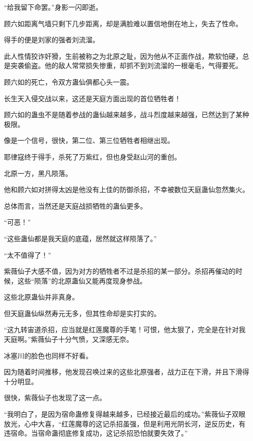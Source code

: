 \begin{this_body}
“给我留下命罢。”身影一闪即逝。

顾六如距离气墙只剩下几步距离，却是满脸难以置信地倒在地上，失去了性命。

得手的便是刘家的强者刘流溜。

此人性情狡诈奸猾，生前被称之为北原之耻，因为他从不正面作战，欺软怕硬，总是突袭偷盗。他的敌人常常损失惨重，却抓不到刘流溜的一根毫毛，气得要死。

顾六如的死亡，令双方蛊仙俱都心头一震。

长生天入侵交战以来，这还是天庭方面出现的首位牺牲者！

顾六如的蛊虫不是随着参战的蛊仙越来越多，战斗烈度越来越强，已然达到了某种极限。

像是一个信号，很快，第二位、第三位牺牲者相继出现。

耶律寇终于得手，杀死了万紫红，但也身受赵山河的重创。

北原一方，黑凡陨落。

他和顾六如对拼得太凶是他没有上佳的防御杀招，不幸被数位天庭蛊仙忽然集火。

总体而言，当然还是天庭战损牺牲的蛊仙更多。

“可恶！”

“这些蛊仙都是我天庭的底蕴，居然就这样陨落了。”

“太不值得了！”

紫薇仙子大感不值，因为对方的牺牲者不过是杀招的某一部分。杀招再催动的时候，这些“陨落”的北原蛊仙又能再度现身参战。

这些北原蛊仙并非真身。

但天庭蛊仙纵然寿元无多，但其性命却是实打实的。

“这九转宙道杀招，应当就是红莲魔尊的手笔！可恨，他太狠了，完全是在针对我天庭啊。”紫薇仙子十分气愤，又深感无奈。

冰塞川的脸色也同样不好看。

因为随着时间推移，他发现召唤过来的这些北原强者，战力正在下滑，并且下滑得十分明显。

很快，紫薇仙子也发现了这一点。

“我明白了，是因为宿命蛊修复得越来越多，已经接近最后的成功。”紫薇仙子双眼放光，心中大喜，“红莲魔尊的这记杀招虽强，但是利用光阴长河，逆反历史，有违宿命。当宿命蛊彻底修复成功，这记杀招恐怕就要失效了。”

\end{this_body}

